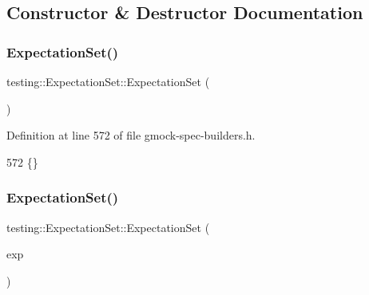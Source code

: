 \subsection{Constructor \& Destructor Documentation}
\mbox{\label{classtesting_1_1ExpectationSet_a78cda231077b84b5c94d25a845a74374}} 
\subsubsection{\texorpdfstring{Expectation\+Set()}{ExpectationSet()}\hspace{0.1cm}{\footnotesize\ttfamily [1/3]}}
{\footnotesize\ttfamily testing\+::\+Expectation\+Set\+::\+Expectation\+Set (\begin{DoxyParamCaption}{ }\end{DoxyParamCaption})\hspace{0.3cm}{\ttfamily [inline]}}



Definition at line 572 of file gmock-\/spec-\/builders.\+h.


\begin{DoxyCode}
572 \{\}
\end{DoxyCode}
\mbox{\label{classtesting_1_1ExpectationSet_a2448d9668e5b1a5372c97f59f1039db6}} 
\subsubsection{\texorpdfstring{Expectation\+Set()}{ExpectationSet()}\hspace{0.1cm}{\footnotesize\ttfamily [2/3]}}
{\footnotesize\ttfamily testing\+::\+Expectation\+Set\+::\+Expectation\+Set (\begin{DoxyParamCaption}\item[{\hyperlink{classtesting_1_1internal_1_1ExpectationBase}{internal\+::\+Expectation\+Base} \&}]{exp }\end{DoxyParamCaption})\hspace{0.3cm}{\ttfamily [inline]}}



